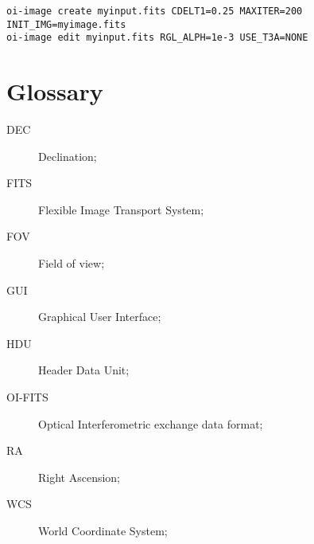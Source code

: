 \documentclass{article}
\begin{document}
\begin{verbatim}
oi-image create myinput.fits CDELT1=0.25 MAXITER=200 INIT_IMG=myimage.fits
oi-image edit myinput.fits RGL_ALPH=1e-3 USE_T3A=NONE
\end{verbatim}

\appendix
\section{Glossary}

\begin{description}
\item[DEC] Declination;
\item[FITS] Flexible Image Transport System;
\item[FOV] Field of view;
\item[GUI] Graphical User Interface;
\item[HDU] Header Data Unit;
\item[OI-FITS] Optical Interferometric exchange data format;
\item[RA] Right Ascension;
\item[WCS] World Coordinate System;
\end{description}



\end{document}
